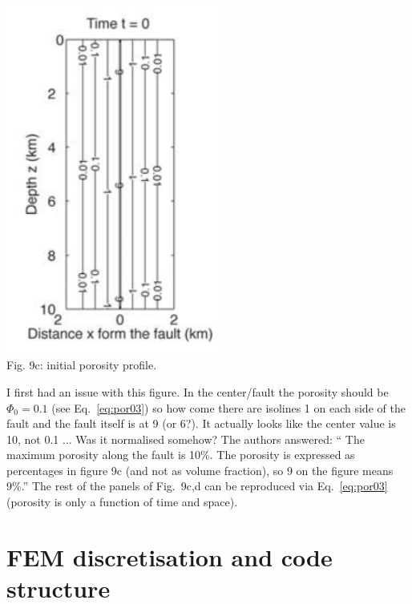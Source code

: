 \begin{center}
\includegraphics[width=7cm]{python_codes/fieldstone_126/images/grfr03b}\\
{\captionfont Fig. 9c: initial porosity profile.}
\end{center}

I first had an issue with this figure. In the center/fault the porosity
should be $\Phi_0=0.1$ (see Eq.~\eqref{eq:por03}) so how come 
there are isolines 1 on each side of the fault and the fault itself is at 9 (or 6?).
It actually looks like the center value is 10, not 0.1 ... Was it normalised somehow? 
The authors answered: ``
The maximum porosity along the fault is 10\%. 
The porosity is expressed as percentages in figure 9c (and not as volume fraction), 
so 9 on the figure means 9\%.''
The rest of the panels of Fig.~9c,d can be reproduced via Eq.~\eqref{eq:por03} 
(porosity is only a function of time and space).


\newpage
\section*{FEM discretisation and code structure}

